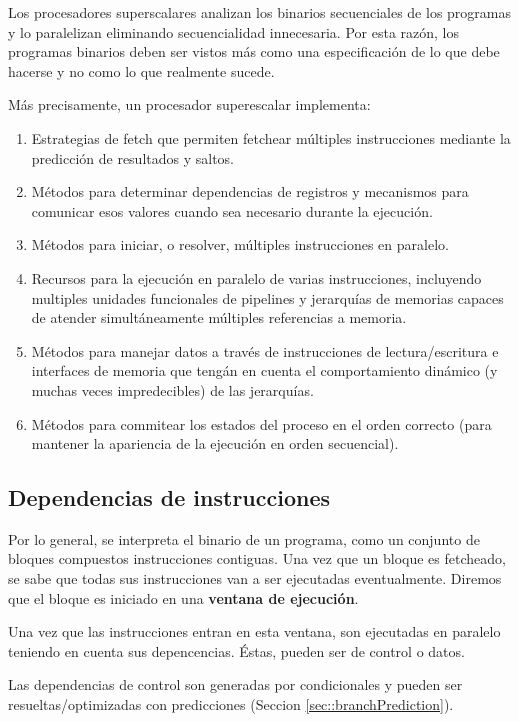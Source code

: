 Los procesadores superscalares analizan los binarios secuenciales de los programas y lo paralelizan eliminando secuencialidad innecesaria. Por esta razón, los programas binarios deben ser vistos más como una especificación de lo que debe hacerse y no como lo que realmente sucede.

Más precisamente, un procesador superescalar implementa:

\begin{enumerate}
	\item Estrategias de fetch que permiten fetchear múltiples instrucciones mediante la predicción de resultados y saltos.
	\item Métodos para determinar dependencias de registros y mecanismos para comunicar esos valores cuando sea necesario durante la ejecución.
	\item Métodos para iniciar, o resolver, múltiples instrucciones en paralelo.
	\item Recursos para la ejecución en paralelo de varias instrucciones, incluyendo multiples unidades funcionales de pipelines y jerarquías de memorias capaces de atender simultáneamente múltiples referencias a memoria.
	\item Métodos para manejar datos a través de instrucciones de lectura/escritura e interfaces de memoria que tengán en cuenta el comportamiento dinámico (y muchas veces impredecibles) de las jerarquías.
	\item Métodos para commitear los estados del proceso en el orden correcto (para mantener la apariencia de la ejecución en orden secuencial).
\end{enumerate}

\subsection{Dependencias de instrucciones}\label{sec:instructionLevelParalelism:dependenciaDeInstrucciones}
Por lo general, se interpreta el binario de un programa, como un conjunto de bloques compuestos instrucciones contiguas. Una vez que un bloque es fetcheado, se sabe que todas sus instrucciones van a ser ejecutadas eventualmente. Diremos que el bloque es iniciado en una \textbf{ventana de ejecución}.

Una vez que las instrucciones entran en esta ventana, son ejecutadas en paralelo teniendo en cuenta sus depencencias. Éstas, pueden ser de control o datos.

Las dependencias de control son generadas por condicionales y pueden ser resueltas/optimizadas con predicciones (Seccion \ref{sec::branchPrediction}). 

